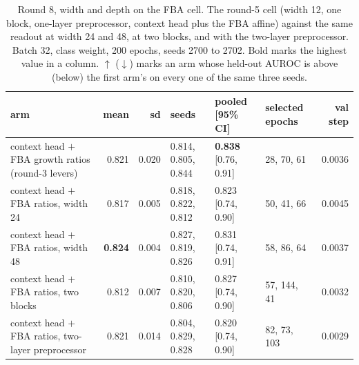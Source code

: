\begin{table}[H]
  \centering
  \footnotesize
  \caption[Round 8, width and depth on the FBA cell]{Round 8, width and depth on the FBA cell. The round-5 cell (width 12, one block, one-layer preprocessor, context head plus the FBA affine) against the same readout at width 24 and 48, at two blocks, and with the two-layer preprocessor. Batch 32, class weight, 200 epochs, seeds 2700 to 2702. Bold marks the highest value in a column. $\uparrow$ ($\downarrow$) marks an arm whose held-out AUROC is above (below) the first arm's on every one of the same three seeds.}
  \label{tab:w19}
  \begin{tabular}{@{}lrrlllr@{}}
    \hline
    arm & mean & sd & seeds & pooled [95\% CI] & selected epochs & val step \\
    \hline
    context head $+$ FBA growth ratios (round-3 levers) & 0.821 & 0.020 & 0.814, 0.805, 0.844 & \textbf{0.838} [0.76, 0.91] & 28, 70, 61 & 0.0036 \\
    context head $+$ FBA ratios, width 24 & 0.817 & 0.005 & 0.818, 0.822, 0.812 & 0.823 [0.74, 0.90] & 50, 41, 66 & 0.0045 \\
    context head $+$ FBA ratios, width 48 & \textbf{0.824} & 0.004 & 0.827, 0.819, 0.826 & 0.831 [0.74, 0.91] & 58, 86, 64 & 0.0037 \\
    context head $+$ FBA ratios, two blocks & 0.812 & 0.007 & 0.810, 0.820, 0.806 & 0.827 [0.74, 0.90] & 57, 144, 41 & 0.0032 \\
    context head $+$ FBA ratios, two-layer preprocessor & 0.821 & 0.014 & 0.804, 0.829, 0.828 & 0.820 [0.74, 0.90] & 82, 73, 103 & 0.0029 \\
    \hline
  \end{tabular}
\end{table}
